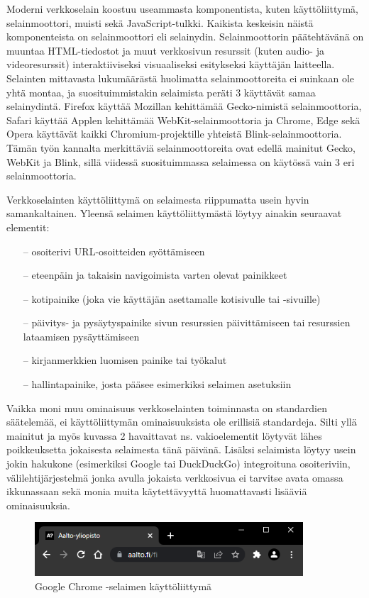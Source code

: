 \documentclass[finnish, 12pt, a4paper, elec, utf8, a-1b, online]{aaltothesis}
\begin{document}
Moderni verkkoselain koostuu useammasta komponentista, kuten käyttöliittymä, selainmoottori, muisti sekä JavaScript-tulkki. Kaikista keskeisin näistä komponenteista on selainmoottori eli selainydin. Selainmoottorin päätehtävänä on muuntaa HTML-tiedostot ja muut verkkosivun resurssit (kuten audio- ja videoresurssit) interaktiiviseksi visuaaliseksi esitykseksi käyttäjän laitteella. Selainten mittavasta lukumäärästä huolimatta selainmoottoreita ei suinkaan ole yhtä montaa, ja suosituimmistakin selaimista peräti 3 käyttävät samaa selainydintä. Firefox käyttää Mozillan kehittämää Gecko-nimistä selainmoottoria, Safari käyttää Applen kehittämää WebKit-selainmoottoria ja Chrome, Edge sekä Opera käyttävät kaikki Chromium-projektille yhteistä Blink-selainmoottoria. \cite{Nield} Tämän työn kannalta merkittäviä selainmoottoreita ovat edellä mainitut Gecko, WebKit ja Blink, sillä viidessä suosituimmassa selaimessa on käytössä vain 3 eri selainmoottoria.

Verkkoselainten käyttöliittymä on selaimesta riippumatta usein hyvin samankaltainen. Yleensä selaimen käyttöliittymästä löytyy ainakin seuraavat elementit:
\begin{itemize}
  \item[--] osoiterivi URL-osoitteiden syöttämiseen
  \item[--] eteenpäin ja takaisin navigoimista varten olevat painikkeet
  \item[--] kotipainike (joka vie käyttäjän asettamalle kotisivulle tai -sivuille)
  \item[--] päivitys- ja pysäytyspainike sivun resurssien päivittämiseen tai resurssien lataamisen pysäyttämiseen
  \item[--] kirjanmerkkien luomisen painike tai työkalut
  \item[--] hallintapainike, josta pääsee esimerkiksi selaimen asetuksiin
\end{itemize}
Vaikka moni muu ominaisuus verkkoselainten toiminnasta on standardien säätelemää, ei käyttöliittymän ominaisuuksista ole erillisiä standardeja. Silti yllä mainitut ja myös kuvassa 2 havaittavat ns. vakioelementit löytyvät lähes poikkeuksetta jokaisesta selaimesta tänä päivänä. Lisäksi selaimista löytyy usein jokin hakukone (esimerkiksi Google tai DuckDuckGo) integroituna osoiteriviin, välilehtijärjestelmä jonka avulla jokaista verkkosivua ei tarvitse avata omassa ikkunassaan sekä monia muita käytettävyyttä huomattavasti lisääviä ominaisuuksia.

\begin{figure}[htb]
  \centering
  \includegraphics[height=2cm]{./img/browser-ui.png}
  \caption{Google Chrome -selaimen käyttöliittymä \label{kuva2}}
\end{figure}
\end{document}
